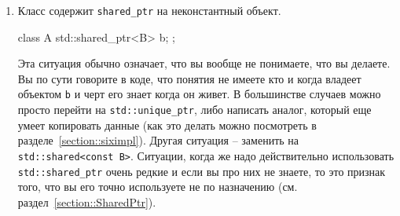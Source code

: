 \begin{enumerate}
\item Класс содержит \verb"shared_ptr" на неконстантный объект.
\begin{cppcode}
class A {
  std::shared_ptr<B> b;
};
\end{cppcode}
Эта ситуация обычно означает, что вы вообще не понимаете, что вы делаете.
Вы по сути говорите в коде, что понятия не имеете кто и когда владеет объектом \verb"b" и черт его знает когда он живет.
В большинстве случаев можно просто перейти на \verb"std::unique_ptr", либо написать аналог, который еще умеет копировать данные (как это делать можно посмотреть в разделе~\ref{section::siximpl}).
Другая ситуация -- заменить на \verb"std::shared<const B>".
Ситуации, когда же надо действительно использовать \verb"std::shared_ptr" очень редкие и если вы про них не знаете, то это признак того, что вы его точно используете не по назначению (см. раздел~\ref{section::SharedPtr}).
\end{enumerate}
